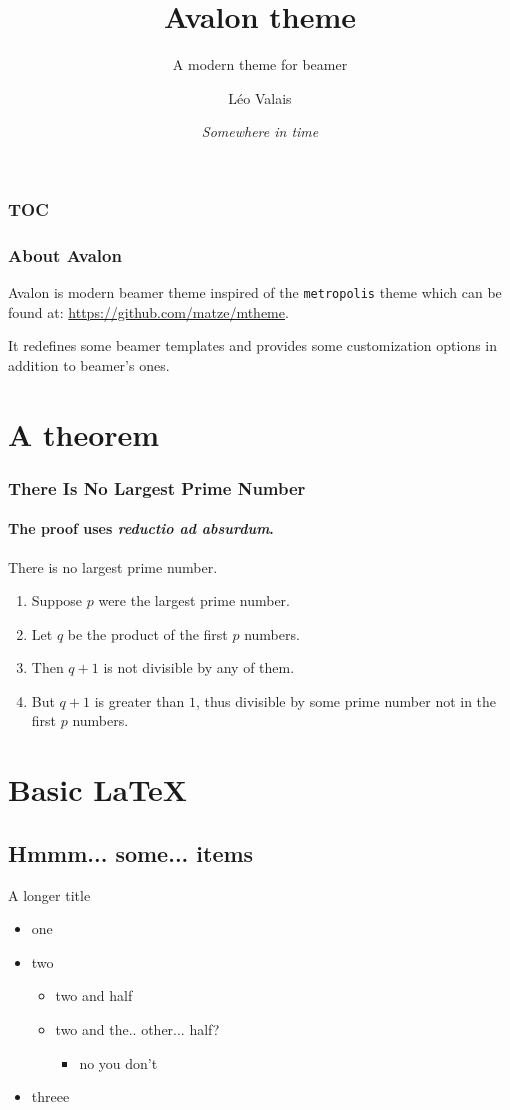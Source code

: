 \documentclass[aspectratio=169]{beamer}
\title{Avalon theme}
\subtitle{A modern theme for beamer}
\date{\it{}Somewhere in time \footnotesize\faMusic}
\author{Léo Valais}
\institute{Institute}
\begin{document}
\begin{frame}
\titlepage
\end{frame}

\begin{frame}
  \frametitle{TOC}
  \tableofcontents
\end{frame}

\begin{frame}
  \frametitle{About Avalon}
  Avalon is modern beamer theme inspired of the \texttt{metropolis} theme which
  can be found at: \textcolor{iOS-tealblue}{\href{https://github.com/matze/mtheme}{https://github.com/matze/mtheme}}.

  It redefines some beamer templates and provides some customization options in
  addition to beamer's ones.
\end{frame}

\section{A theorem}
\begin{frame}
\frametitle{There Is No Largest Prime Number}
\framesubtitle{The proof uses \textit{reductio ad absurdum}.}
\begin{theorem}
There is no largest prime number. \end{theorem}
\begin{enumerate}
\item<1-| alert@1> Suppose $p$ were the largest prime number.
\item<2-> Let $q$ be the product of the first $p$ numbers.
\item<3-> Then $q+1$ is not divisible by any of them.
\item<1-> But $q + 1$ is greater than $1$, thus divisible by some prime
number not in the first $p$ numbers.
\end{enumerate}
\end{frame}

\section{Basic \LaTeX}
\subsection{Hmmm... some... items}
\begin{frame}{A longer title}
  \begin{itemize}
  \item one
  \item two
    \begin{itemize}
    \item two and half
    \item two and the.. other... half?
      \begin{itemize}
      \item no you don't
      \end{itemize}
    \end{itemize}
  \item \textrm{threee}
  \end{itemize}
\end{frame}
\end{document}
